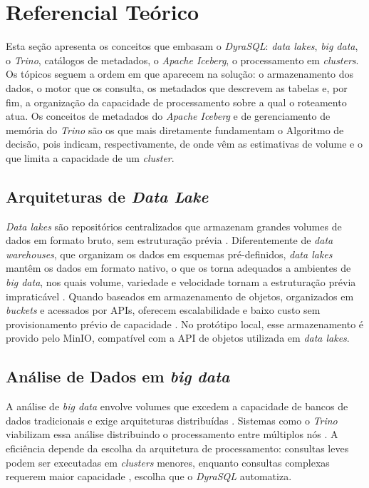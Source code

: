 \FloatBarrier
\section{Referencial Teórico}
\label{sec:referencial-teorico}

Esta seção apresenta os conceitos que embasam o \textit{DyraSQL}: \textit{data lakes}, \textit{big data}, o \textit{Trino}, catálogos de metadados, o \textit{Apache Iceberg}, o processamento em \textit{clusters}. Os tópicos seguem a ordem em que aparecem na solução: o armazenamento dos dados, o motor que os consulta, os metadados que descrevem as tabelas e, por fim, a organização da capacidade de processamento sobre a qual o roteamento atua. Os conceitos de metadados do \textit{Apache Iceberg} e de gerenciamento de memória do \textit{Trino} são os que mais diretamente fundamentam o Algoritmo de decisão, pois indicam, respectivamente, de onde vêm as estimativas de volume e o que limita a capacidade de um \textit{cluster}.

\subsection{Arquiteturas de \textit{Data Lake}}

\textit{Data lakes} são repositórios centralizados que armazenam grandes volumes de dados em formato bruto, sem estruturação prévia \cite{dremiodatalake}. Diferentemente de \textit{data warehouses}, que organizam os dados em esquemas pré-definidos, \textit{data lakes} mantêm os dados em formato nativo, o que os torna adequados a ambientes de \textit{big data}, nos quais volume, variedade e velocidade tornam a estruturação prévia impraticável \cite{dremiodatalake,ibmbigdata}. Quando baseados em armazenamento de objetos, organizados em \textit{buckets} e acessados por APIs, oferecem escalabilidade e baixo custo sem provisionamento prévio de capacidade \cite{dremiodatalake,ibmbigdata}. No protótipo local, esse armazenamento é provido pelo MinIO, compatível com a API de objetos utilizada em \textit{data lakes}.

\subsection{Análise de Dados em \textit{big data}}

A análise de \textit{big data} envolve volumes que excedem a capacidade de bancos de dados tradicionais e exige arquiteturas distribuídas \cite{ibmbigdata}. Sistemas como o \textit{Trino} viabilizam essa análise distribuindo o processamento entre múltiplos nós \cite{trinoconcepts}. A eficiência depende da escolha da arquitetura de processamento: consultas leves podem ser executadas em \textit{clusters} menores, enquanto consultas complexas requerem maior capacidade \cite{ibmbigdata}, escolha que o \textit{DyraSQL} automatiza.

